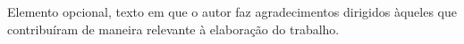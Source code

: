 \begin{agradecimentos}
Elemento opcional, texto em que o autor faz agradecimentos dirigidos àqueles que contribuíram de maneira relevante à elaboração do trabalho.
\end{agradecimentos}